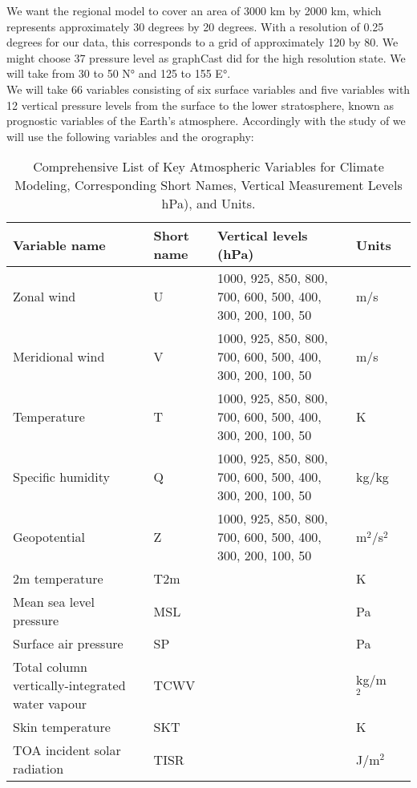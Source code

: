 We want the regional model to cover an area of 3000 km by 2000 km, which represents approximately 30 degrees by 20 degrees. With a resolution of 0.25 degrees for our data, this corresponds to a grid of approximately 120 by 80. We might choose 37 pressure level as graphCast did for the high resolution state. We will take from 30 to 50 N° and 125 to 155 E°.\\

We will take 66 variables consisting of six surface variables and five variables with 12 vertical pressure levels from the surface to the lower stratosphere, known as prognostic variables of the Earth’s atmosphere. Accordingly with the study of  \cite{cheon2024advancing} we will use the following variables and the orography:\\

\begin{table}[!h]
	\caption{Comprehensive List of Key Atmospheric Variables for Climate Modeling, Corresponding Short Names, Vertical Measurement Levels hPa), and Units.}
	\centering
    \scriptsize
	\begin{tabularx}{\textwidth}{@{}lXXXX@{}}
		\toprule
		Variable name & Short name & Vertical levels (hPa) & Units & \\
		\midrule
		Zonal wind & U & 1000, 925, 850, 800, 700, 600, 500, 400, 300, 200, 100, 50 & m/s & \\
		\addlinespace
		Meridional wind & V & 1000, 925, 850, 800, 700, 600, 500, 400, 300, 200, 100, 50 & m/s & \\
		\addlinespace
		Temperature & T & 1000, 925, 850, 800, 700, 600, 500, 400, 300, 200, 100, 50 & K & \\
		\addlinespace
		Specific humidity & Q & 1000, 925, 850, 800, 700, 600, 500, 400, 300, 200, 100, 50 & kg/kg & \\
		\addlinespace
		Geopotential & Z & 1000, 925, 850, 800, 700, 600, 500, 400, 300, 200, 100, 50 & m\(^2\)/s\(^2\) & \\
		\addlinespace
		2m temperature & T2m & & K & \\
		\addlinespace
		Mean sea level pressure & MSL & & Pa & \\
		\addlinespace
		Surface air pressure & SP & & Pa & \\
		\addlinespace
		Total column vertically-integrated water vapour & TCWV & & kg/m\(^2\) & \\
		\addlinespace
		Skin temperature & SKT & & K & \\
		\addlinespace
		TOA incident solar radiation & TISR & & J/m\(^2\) & \\
		\bottomrule
	\end{tabularx}
	\label{tab:variables}
\end{table}

